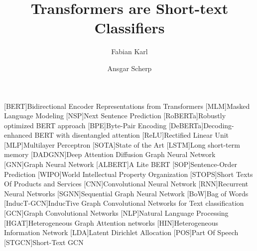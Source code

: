 \documentclass[runningheads]{llncs}
\begin{document}
\begin{acronym}
[BERT]{Bidirectional Encoder Representations from Transformers}
[MLM]{Masked Language Modeling}
[NSP]{Next Sentence Prediction}
[RoBERTa]{Robustly optimized BERT approach}
[BPE]{Byte-Pair Encoding}
[DeBERTa]{De\-coding-enhanced BERT with disentangled attention}
[ReLU]{Rectified Linear Unit}
[MLP]{Multilayer Perceptron}
[SOTA]{State of the Art}
[LSTM]{Long short-term memory}
[DADGNN]{Deep Attention Diffusion Graph Neural Net\-work}
[GNN]{Graph Neural Network}
[ALBERT]{A Lite BERT}
[SOP]{Sentence-Order Prediction}
[WIPO]{World Intellectual Property Organization}
[STOPS]{Short Texts Of Products and Services}
[CNN]{Convolutional Neural Network}
[RNN]{Recurrent Neural Networks}
[SGNN]{Sequential Graph Neural Net\-work}
[BoW]{Bag of Words}
[InducT-GCN]{InducTive Graph Convolutional Networks for Text classification}
[GCN]{Graph Convolutional Networks}
[NLP]{Natural Language Processing}
[HGAT]{Heterogeneous Graph Attention networks}
[HIN]{Heterogeneous Information Network}
[LDA]{Latent Dirichlet Allocation}
[POS]{Part Of Speech}
[STGCN]{Short-Text \acl{GCN}}
\end{acronym}

\title{Transformers are Short-text Classifiers}
\author{Fabian Karl
\and
Ansgar Scherp
}
\maketitle              
\end{document}

